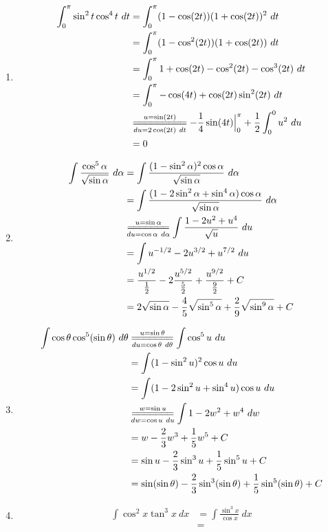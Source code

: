 \documentclass[a4]{article}
\begin{document}
\begin{enumerate}[label={\bf{}\arabic*}.]
\item%
	\begin{align*}
	\int_0^\pi\sin^2t\cos^4t\ dt&=\int_0^\pi(1-\cos(2t))(1+\cos(2t))^2\ dt\\
	&=\int_0^\pi(1-\cos^2(2t))(1+\cos(2t))\ dt\\
	&=\int_0^\pi1+\cos(2t)-\cos^2(2t)-\cos^3(2t)\ dt\\
	&=\int_0^\pi-\cos(4t)+\cos(2t)\sin^2(2t)\ dt\\
	&\overset{u=\sin(2t)}{\underset{du=2\cos(2t)\ dt}{=\joinrel=\joinrel=\joinrel=\joinrel=\joinrel=\joinrel=\joinrel=\joinrel=}}-\frac{1}{4}\sin(4t)\Big|_0^\pi+\frac{1}{2}\int_0^0u^2\ du\\
	&=0
	\end{align*}

\item%
	\begin{align*}
	\int\frac{\cos^5\alpha}{\sqrt{\sin\alpha}}\ d\alpha&=\int\frac{(1-\sin^2\alpha)^2\cos\alpha}{\sqrt{\sin\alpha}}\ d\alpha\\
	&=\int\frac{(1-2\sin^2\alpha+\sin^4\alpha)\cos\alpha}{\sqrt{\sin\alpha}}\ d\alpha\\
	&\overset{u=\sin\alpha}{\underset{du=\cos\alpha\ d\alpha}{=\joinrel=\joinrel=\joinrel=\joinrel=\joinrel=\joinrel=}}\int\frac{1-2u^2+u^4}{\sqrt{u}}\ du\\
	&=\int u^{-1/2}-2u^{3/2}+u^{7/2}\ du\\
	&=\frac{u^{1/2}}{\frac{1}{2}}-2\frac{u^{5/2}}{\frac{5}{2}}+\frac{u^{9/2}}{\frac{9}{2}}+C\\
	&=2\sqrt{\sin\alpha}-\frac{4}{5}\sqrt{\sin^5\alpha}+\frac{2}{9}\sqrt{\sin^9\alpha}+C
	\end{align*}

\item%
	\begin{align*}
	\int\cos\theta\cos^5(\sin\theta)\ d\theta&\overset{u=\sin\theta}{\underset{du=\cos\theta\ d\theta}{=\joinrel=\joinrel=\joinrel=\joinrel=\joinrel=\joinrel=}}\int\cos^5u\ du\\
	&=\int(1-\sin^2u)^2\cos u\ du\\
	&=\int(1-2\sin^2u+\sin^4 u)\cos u\ du\\
	&\overset{w=\sin u}{\underset{dw=\cos u\ du}{=\joinrel=\joinrel=\joinrel=\joinrel=\joinrel=\joinrel=}}\int1-2w^2+w^4\ dw\\
	&=w-\frac{2}{3}w^3+\frac{1}{5}w^5+C\\
	&=\sin u-\frac{2}{3}\sin^3u+\frac{1}{5}\sin^5u+C\\
	&=\sin(\sin\theta)-\frac{2}{3}\sin^3(\sin\theta)+\frac{1}{5}\sin^5(\sin\theta)+C
	\end{align*}

\item%
	\begin{align*}
	\int\cos^2x\tan^3x\ dx&=\int\frac{\sin^3x}{\cos x}\ dx\\
	&=
	\end{align*}




\end{enumerate}
\end{document}
